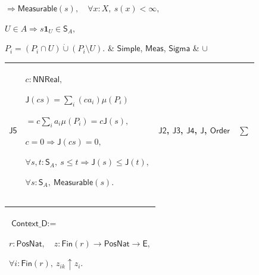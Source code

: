 \documentclass[11pt]{amsart}
\newlength{\FTCOneColumnBody}
\newlength{\FTCFourColumnBody}
\begin{document}
{\begin{tabular}
$\displaystyle \Rightarrow\textsf{Measurable}(s),\quad\forall x:X,\ s(x)<\infty,$\par
$\displaystyle U\in A\Rightarrow s\mathbf1_U\in\textsf{S}_A,$\par
$\displaystyle P_i=(P_i\cap U)\mathbin{\dot\cup}(P_i\setminus U).$ & \hyperlink{def:Simple}{$\displaystyle \textsf{Simple}$}, \hyperlink{def:Meas}{$\displaystyle \textsf{Meas}$}, \hyperlink{ax:Sigma}{$\displaystyle \textsf{Sigma}$} & $\displaystyle \cup$\\ \hline
\end{tabular}%
\par\setlength{\parskip}{0pt}\nointerlineskip
\noindent
\begin{tabular}{|@{}>{\centering\arraybackslash}m{0.078431\FTCFourColumnBody}|>{\centering\arraybackslash}m{0.535947\FTCFourColumnBody}|>{\centering\arraybackslash}m{0.281045\FTCFourColumnBody}|>{\centering\arraybackslash}m{0.104575\FTCFourColumnBody}|}\hline
\hypertarget{proof:J5}{$\displaystyle \textsf{J5}$} & $\displaystyle c:\textsf{NNReal},$\par
$\displaystyle \textsf{J}(cs)=\sum_i(ca_i)\mu(P_i)$\par
$\displaystyle {}=c\sum_i a_i\mu(P_i)=c\textsf{J}(s),$\par
$\displaystyle c=0\Rightarrow\textsf{J}(cs)=0,$\par
$\displaystyle \forall s,t:\textsf{S}_A,\ s\le t\Rightarrow\textsf{J}(s)\le\textsf{J}(t),$\par
$\displaystyle \forall s:\textsf{S}_A,\ \textsf{Measurable}(s).$ & \hyperlink{proof:J2}{$\displaystyle \textsf{J2}$}, \hyperlink{proof:J3}{$\displaystyle \textsf{J3}$}, \hyperlink{proof:J4}{$\displaystyle \textsf{J4}$}, \hyperlink{def:J}{$\displaystyle \textsf{J}$}, \hyperlink{ax:Order}{$\displaystyle \textsf{Order}$} & $\displaystyle \sum$\\ \hline
\end{tabular}%
\par\setlength{\parskip}{0pt}\nointerlineskip
\noindent
\begin{tabular}{|@{}>{\centering\arraybackslash}m{\FTCOneColumnBody}|}\hline
$\displaystyle \textsf{Context\_D}:=$\par
$\displaystyle r:\textsf{PosNat},\quad z:\textsf{Fin}(r)\to\textsf{PosNat}\to\textsf{E},$\par
$\displaystyle \forall i:\textsf{Fin}(r),\ z_{ik}\uparrow z_i.$\\ \hline
\end{tabular}%
\par\setlength{\parskip}{0pt}\nointerlineskip
}
\end{document}
